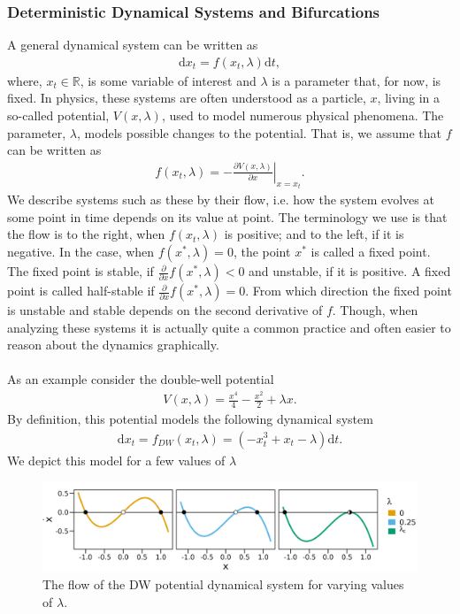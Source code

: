 \subsubsection{Deterministic Dynamical Systems and Bifurcations}
A general dynamical system can be written as
\begin{align}
    \mathrm{d}x_t = f(x_t, \lambda)\mathrm{d}t, \label{eq:generalDynamicalSystem}
\end{align}
where, $x_t\in\mathbb{R}$, is some variable of interest and $\lambda$ is a parameter that, for now, is fixed. In physics, these systems are often understood as a particle, $x$, living in a so-called potential, $V(x,\lambda)$, used to model numerous physical phenomena. The parameter, $\lambda$, models possible changes to the potential. That is, we assume that $f$ can be written as
\begin{align}
     f(x_t, \lambda) = \left.-\frac{\partial V(x,\lambda)}{\partial x}\right|_{x=x_t}.
\end{align}
We describe systems such as these by their flow, i.e. how the system evolves at some point in time depends on its value at point. The terminology we use is that the flow is to the right, when $f(x_t, \lambda)$ is positive; and to the left, if it is negative. In the case, when $f(x^*, \lambda) = 0$, the point $x^*$ is called a fixed point. The fixed point is stable, if $\frac{\partial}{\partial x}f(x^*, \lambda) < 0$ and unstable, if it is positive. A fixed point is called half-stable if $\frac{\partial}{\partial x}f(x^*, \lambda) = 0$. From which direction the fixed point is unstable and stable depends on the second derivative of $f$. Though, when analyzing these systems it is actually quite a common practice and often easier to reason about the dynamics graphically.\\\\
As an example consider the double-well potential
\begin{align}
    V(x,\lambda) = \frac{x^4}{4} - \frac{x^2}{2} + \lambda x\label{eq:doubleWellPotential}.
\end{align}
By definition, this potential models the following dynamical system
\begin{align}
    \mathrm{d}x_t = f_{DW}(x_t, \lambda) = \left(-x_t^3 + x_t - \lambda \right) \mathrm{d}t \label{eq:originalDW}.
\end{align}
We depict this model for a few values of $\lambda$
\begin{figure}[h]
    \begin{center}
        \includegraphics[scale = .14]{figures/double_well_plot.jpeg}
        \caption{The flow of the DW potential dynamical system for varying values of $\lambda$.}
        \label{figure:DW_dynamic_plot}
    \end{center}
\end{figure}\\
